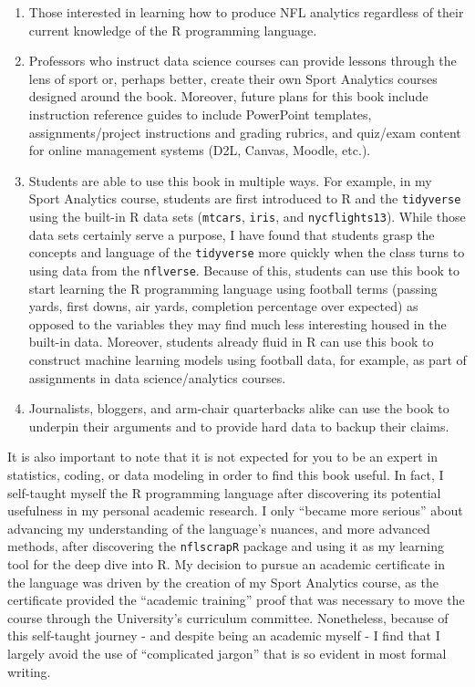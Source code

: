 \documentclass[
  letterpaper,
]{krantz}
\begin{document}
\begin{enumerate}
\def\labelenumi{\arabic{enumi}.}
\item
  Those interested in learning how to produce NFL analytics regardless
  of their current knowledge of the R programming language.
\item
  Professors who instruct data science courses can provide lessons
  through the lens of sport or, perhaps better, create their own Sport
  Analytics courses designed around the book. Moreover, future plans for
  this book include instruction reference guides to include PowerPoint
  templates, assignments/project instructions and grading rubrics, and
  quiz/exam content for online management systems (D2L, Canvas, Moodle,
  etc.).
\item
  Students are able to use this book in multiple ways. For example, in
  my Sport Analytics course, students are first introduced to R and the
  \texttt{tidyverse} using the built-in R data sets (\texttt{mtcars},
  \texttt{iris}, and \texttt{nycflights13}). While those data sets
  certainly serve a purpose, I have found that students grasp the
  concepts and language of the \texttt{tidyverse} more quickly when the
  class turns to using data from the \texttt{nflverse}. Because of this,
  students can use this book to start learning the R programming
  language using football terms (passing yards, first downs, air yards,
  completion percentage over expected) as opposed to the variables they
  may find much less interesting housed in the built-in data. Moreover,
  students already fluid in R can use this book to construct machine
  learning models using football data, for example, as part of
  assignments in data science/analytics courses.
\item
  Journalists, bloggers, and arm-chair quarterbacks alike can use the
  book to underpin their arguments and to provide hard data to backup
  their claims.
\end{enumerate}

It is also important to note that it is not expected for you to be an
expert in statistics, coding, or data modeling in order to find this
book useful. In fact, I self-taught myself the R programming language
after discovering its potential usefulness in my personal academic
research. I only ``became more serious'' about advancing my
understanding of the language's nuances, and more advanced methods,
after discovering the \texttt{nflscrapR} package and using it as my
learning tool for the deep dive into R. My decision to pursue an
academic certificate in the language was driven by the creation of my
Sport Analytics course, as the certificate provided the ``academic
training'' proof that was necessary to move the course through the
University's curriculum committee. Nonetheless, because of this
self-taught journey - and despite being an academic myself - I find that
I largely avoid the use of ``complicated jargon'' that is so evident in
most formal writing.
\end{document}
